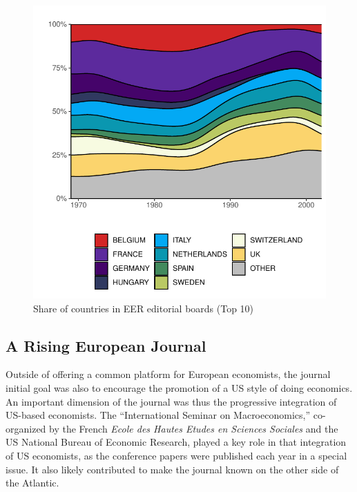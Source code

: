 \documentclass[]{elsarticle} %
\begin{document}
\begin{figure}[h]

{\centering \includegraphics{First_version_files/figure-latex/plot-boards-1} 

}

\caption{Share of countries in EER editorial boards (Top 10)}\label{fig:plot-boards}
\end{figure}

\hypertarget{rising-journal}{%
\subsection{A Rising European Journal}\label{rising-journal}}

Outside of offering a common platform for European economists, the
journal initial goal was also to encourage the promotion of a US style
of doing economics. An important dimension of the journal was thus the
progressive integration of US-based economists. The ``International
Seminar on Macroeconomics,'' co-organized by the French \emph{Ecole des
Hautes Etudes en Sciences Sociales} and the US National Bureau of
Economic Research, played a key role in that integration of US
economists, as the conference papers were published each year in a
special issue. It also likely contributed to make the journal known on
the other side of the Atlantic.
\end{document}
